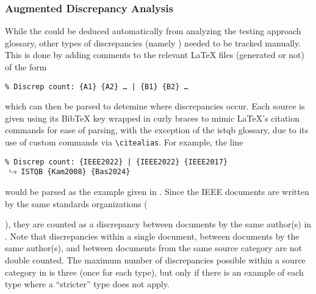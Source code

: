 \subsubsection{Augmented Discrepancy Analysis}
\label{aug-discrep-analysis}
While the \autoDiscreps{} could be deduced automatically from analyzing the
testing approach glossary, other types of discrepancies (namely
) needed to be tracked manually. This is done by adding
comments to the relevant \LaTeX{} files (generated or not) of the form
\begin{displayquote}
    \texttt{\% Discrep count: \{A1\} \{A2\} \dots{} | \{B1\} \{B2\} \dots}
\end{displayquote}
which can then be parsed to detemine where discrepancies occur. Each source is
given using its BibTeX key wrapped in curly braces to mimic \LaTeX{}'s citation
commands for ease of parsing, with the exception of the \acs{istqb} glossary,
due to its use of custom commands via \texttt{\textbackslash citealias}. For
example, the line
\begin{displayquote}
    \texttt{\% Discrep count: \{IEEE2022\} | \{IEEE2022\} \{IEEE2017\}\\
        $\,\hookrightarrow\,$\quad ISTQB \{Kam2008\} \{Bas2024\}}
\end{displayquote}
would be parsed as the example given in . Since
the IEEE documents are written by the same standards organizations
(\begin{NoHyper}\citeauthor{IEEE2022}\end{NoHyper}), they are counted as a
discrepancy between documents by the same author(s) in .
Note that discrepancies within a single document, between documents by the same
author(s), and between documents from the same source category are not double
counted. The maximum number of discrepancies possible within a source category
in  is three (once for each type), but only if there
is an example of each type where a ``stricter'' type does not apply.%
